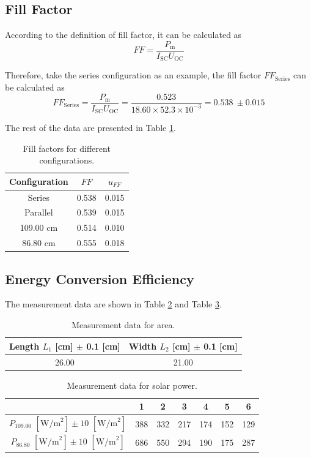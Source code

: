 \documentclass{article}
\begin{document}
{\subsection{Fill Factor}

According to the definition of fill factor, it can be calculated as
$$
FF = \frac{P_{\mathrm{m}}}{I_{\mathrm{SC}}U_{\mathrm{OC}}}
$$

Therefore, take the series configuration as an example, the fill factor $FF_{\mathrm{Series}}$ can be calculated as
$$
FF_{\mathrm{Series}}=\frac{P_{\mathrm{m}}}{I_{\mathrm{SC}}U_{\mathrm{OC}}}=\frac{0.523}{18.60\times52.3\times10^{-3}}=0.538~\pm 0.015 
$$

The rest of the data are presented in Table \ref{tab.FF}.

\begin{table}[H]
\centering
\begin{tabular}{ccc}
\toprule
Configuration & $FF$ & $u_{FF}$ \\ 
\midrule
Series & 0.538 & 0.015 \\
Parallel & 0.539 & 0.015 \\
109.00 cm & 0.514 & 0.010 \\
86.80 cm & 0.555 & 0.018 \\ 
\bottomrule
\end{tabular}
\caption{Fill factors for different configurations.}\label{tab.FF}
\end{table}

\subsection{Energy Conversion Efficiency}

The measurement data are shown in Table \ref{TableArea} and Table \ref{tab.Pin}.
\begin{table}[H]\centering
    \begin{tabular}{cc}
        \toprule
        Length $L_1$ [cm] $\pm$ 0.1 [cm] & Width $L_2$ [cm] $\pm$ 0.1 [cm] \\
        \midrule
        26.00                             & 21.00                            \\
        \bottomrule
    \end{tabular}
    \caption{Measurement data for area.}\label{TableArea}
\end{table}

\begin{table}[H]\centering
    \begin{tabular}{ccccccc}
        \toprule
                                                               & 1     & 2     & 3   & 4   & 5     & 6     \\
        \midrule
        $P_{109.00}\,\,[\text{W/m}^2] \pm 10\,\,[\text{W/m}^2]$ & 388 & 332 & 217 & 174 & 152 & 129 \\
        $P_{86.80}\,\,[\text{W/m}^2] \pm 10\,\,[\text{W/m}^2]$ & 686 & 550 & 294 & 190 & 175 & 287   \\
        \bottomrule
    \end{tabular}
    \caption{Measurement data for solar power.}\label{tab.Pin}
\end{table}

}
\end{document}
